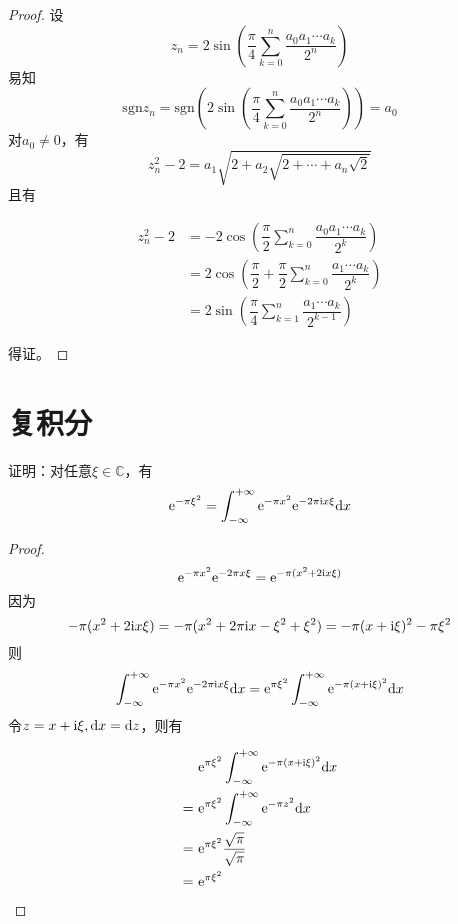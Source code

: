 \begin{proof}

    设
    $$z_n = 2 \sin{\left(\dfrac{\pi}{4} \sum\limits_{k = 0}^{n}{\dfrac{a_0 a_1 \cdots a_k}{2^n}}\right)}$$
    易知
    $$\mathrm{sgn}{z_n} = \mathrm{sgn}\left(2 \sin{\left( \dfrac{\pi}{4} \sum\limits_{k = 0}^{n}{\dfrac{a_0 a_1 \cdots a_k}{2^n}} \right)} \right) = a_0$$
    对$a_0 \neq 0$，有
    $$z_n^2 - 2 = a_1\sqrt{2 + a_2\sqrt{2 + \cdots + a_n\sqrt{2}}}$$
    且有

    \begin{align*}
        z_n^2 - 2 & = -2 \cos{\left(\dfrac{\pi}{2}\sum\limits_{k = 0}^{n}{\dfrac{a_0 a_1 \cdots a_k}{2^k}}\right)} \\
        & = 2 \cos{\left(\dfrac{\pi}{2} + \dfrac{\pi}{2}\sum\limits_{k = 0}^{n}{\dfrac{a_1 \cdots a_k}{2^k}}\right)} \\
        & = 2 \sin{\left(\dfrac{\pi}{4}\sum\limits_{k = 1}^{n}{\dfrac{a_1 \cdots a_k}{2^{k - 1}}}\right)}
    \end{align*}

    得证。

\end{proof}

\section{复积分}

\begin{proposition}

    证明：对任意$ \xi \in \mathbb{C}$，有
    $$\mathrm{e}^{-\pi\xi^2} = \int_{-\infty}^{+\infty}{\mathrm{e}^{-\pi x^2}\mathrm{e}^{-2\pi \mathrm{i} x\xi}}\mathrm{d} x$$
    
\end{proposition}

\begin{proof}

    $$\mathrm{e}^{-\pi x^2}\mathrm{e}^{-2\pi x\xi} = \mathrm{e}^{-\pi(x^2 + 2\mathrm{i} x\xi)}$$
    因为
    $$-\pi(x^2 + 2\mathrm{i} x\xi) = -\pi (x^2 + 2\pi\mathrm{i} x - \xi^2 + \xi^2) = -\pi(x + \mathrm{i} \xi)^2 - \pi\xi^2$$
    则
    $$\int_{-\infty}^{+\infty}{\mathrm{e}^{-\pi x^2}\mathrm{e}^{-2\pi \mathrm{i} x\xi}}\mathrm{d} x = \mathrm{e}^{\pi\xi^2} \int_{-\infty}^{+\infty}{\mathrm{e}^{-\pi (x+\mathrm{i}\xi)^2}}\mathrm{d} x$$
    令$z = x + \mathrm{i}\xi, \mathrm{d} x = \mathrm{d} z$，则有

    \begin{align*}
        & \mathrm{e}^{\pi\xi^2} \int_{-\infty}^{+\infty}{\mathrm{e}^{-\pi (x+\mathrm{i}\xi)^2}}\mathrm{d} x \\
        = \ & \mathrm{e}^{\pi\xi^2} \int_{-\infty}^{+\infty}{\mathrm{e}^{-\pi z^2}}\mathrm{d} x \\
        = \ & \mathrm{e}^{\pi\xi^2} \dfrac{\sqrt{\pi}}{\sqrt{\pi}} \\
        = \ & \mathrm{e}^{\pi\xi^2}
    \end{align*}

\end{proof}

